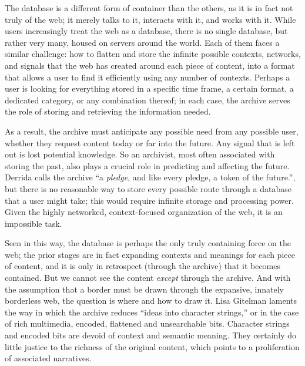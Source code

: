 The database is a different form of container than the others, as it is in fact not truly of the web; it merely talks to it, interacts with it, and works with it. While users increasingly treat the web as a database, there is no single database, but rather very many, housed on servers around the world. Each of them faces a similar challenge: how to flatten and store the infinite possible contexts, networks, and signals that the web has created around each piece of content, into a format that allows a user to find it efficiently using any number of contexts. Perhaps a user is looking for everything stored in a specific time frame, a certain format, a dedicated category, or any combination thereof; in each case, the archive serves the role of storing and retrieving the information needed.

As a result, the archive must anticipate any possible need from any possible user, whether they request content today or far into the future. Any signal that is left out is lost potential knowledge. So an archivist, most often associated with storing the past, also plays a crucial role in predicting and affecting the future. Derrida calls the archive ``a \emph{pledge}, and like every pledge, a token of the future.''\autocite[18]{derrida_archive_1995}, but there is no reasonable way to store every possible route through a database that a user might take; this would require infinite storage and processing power. Given the highly networked, context-focused organization of the web, it is an impossible task.

Seen in this way, the database is perhaps the only truly containing force on the web; the prior stages are in fact expanding contexts and meanings for each piece of content, and it is only in retrospect (through the archive) that it becomes contained. But we cannot see the content \emph{except} through the archive. And with the assumption that a border must be drawn through the expansive, innately borderless web, the question is where and how to draw it. Lisa Gitelman laments the way in which the archive reduces ``ideas into character strings,'' or in the case of rich multimedia, encoded, flattened and unsearchable bits.\autocite{gitelman_response_2013} Character strings and encoded bits are devoid of context and semantic meaning. They certainly do little justice to the richness of the original content, which points to a proliferation of associated narratives.

